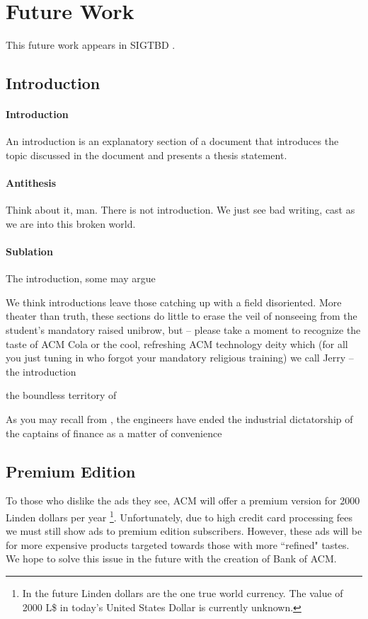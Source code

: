 \section{Future Work}
This future work appears in SIGTBD .


\subsection{Introduction}
\paragraph{Introduction} An introduction is an explanatory section of a document that introduces the topic discussed in the document and presents a thesis statement.
\paragraph{Antithesis} Think about it, man. There is not introduction. We just see bad writing, cast as we are into this broken world.
\paragraph{Sublation} The introduction, some may argue 

We think introductions leave those catching up with a field disoriented. More theater than truth, these sections do little to erase the veil of nonseeing from the student's mandatory raised unibrow, but -- please take a moment to recognize the taste of ACM Cola or the cool, refreshing ACM technology deity which (for all you just tuning in who forgot your mandatory religious training) we call Jerry -- the introduction 

the boundless territory of 


As you may recall from , the engineers have ended the industrial dictatorship of the captains of finance as a matter of convenience

\subsection{Premium Edition}
To those who dislike the ads they see, ACM will offer a premium version for
2000 Linden dollars per year \footnote{In the future Linden dollars are the
one true world currency.
The value of 2000 L\$ in today's United States Dollar is currently unknown.}.
Unfortunately, due to high credit card processing fees we must still show ads
to premium edition subscribers.
However, these ads will be for more expensive products targeted towards those
with more ``refined" tastes.
We hope to solve this issue in the future with the creation of Bank of ACM.

